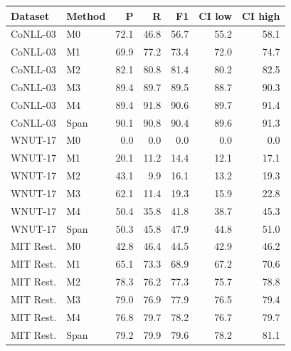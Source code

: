 \begin{tabular}{@{}llrrrrr@{}}
\toprule
Dataset & Method & P & R & F1 & CI low & CI high \\
\midrule
CoNLL-03 & M0 & 72.1 & 46.8 & 56.7 & 55.2 & 58.1 \\
CoNLL-03 & M1 & 69.9 & 77.2 & 73.4 & 72.0 & 74.7 \\
CoNLL-03 & M2 & 82.1 & 80.8 & 81.4 & 80.2 & 82.5 \\
CoNLL-03 & M3 & 89.4 & 89.7 & 89.5 & 88.7 & 90.3 \\
CoNLL-03 & M4 & 89.4 & 91.8 & 90.6 & 89.7 & 91.4 \\
CoNLL-03 & Span & 90.1 & 90.8 & 90.4 & 89.6 & 91.3 \\
WNUT-17 & M0 & 0.0 & 0.0 & 0.0 & 0.0 & 0.0 \\
WNUT-17 & M1 & 20.1 & 11.2 & 14.4 & 12.1 & 17.1 \\
WNUT-17 & M2 & 43.1 & 9.9 & 16.1 & 13.2 & 19.3 \\
WNUT-17 & M3 & 62.1 & 11.4 & 19.3 & 15.9 & 22.8 \\
WNUT-17 & M4 & 50.4 & 35.8 & 41.8 & 38.7 & 45.3 \\
WNUT-17 & Span & 50.3 & 45.8 & 47.9 & 44.8 & 51.0 \\
MIT Rest. & M0 & 42.8 & 46.4 & 44.5 & 42.9 & 46.2 \\
MIT Rest. & M1 & 65.1 & 73.3 & 68.9 & 67.2 & 70.6 \\
MIT Rest. & M2 & 78.3 & 76.2 & 77.3 & 75.7 & 78.8 \\
MIT Rest. & M3 & 79.0 & 76.9 & 77.9 & 76.5 & 79.4 \\
MIT Rest. & M4 & 76.8 & 79.7 & 78.2 & 76.7 & 79.7 \\
MIT Rest. & Span & 79.2 & 79.9 & 79.6 & 78.2 & 81.1 \\
\bottomrule
\end{tabular}
